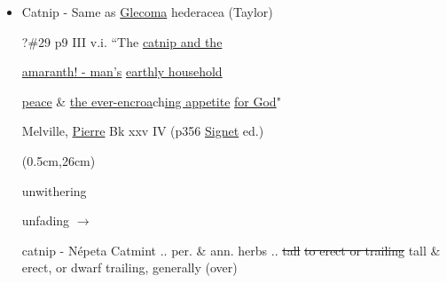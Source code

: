 \documentclass[a4paper,10pt]{article}
\begin{document}
\begin{flushleft}
\begin{itemize}
\item Catnip - Same as \underline{Glecoma} hederacea (Taylor)\par
{}
?\#29 p9 III v.i. ``The \ul{catnip and the} \par
\ul{amaranth! - man's} \ul{earthly household} \par
\ul{peace} \& \ul{the ever-encroa}ch\ul{ing appetite} \ul{for God}"\par
{}
Melville, \ul{Pierre} Bk xxv IV (p356 \ul{Signet} ed.)
\color{red}
\begin{textblock*}{2in}(0.5cm,26cm)%
    \small
    \begin{minipage}{2in} 
        \color{red}
        unwithering\par
        unfading $\rightarrow$
        \normalsize
  \end{minipage}%
  \end{textblock*}%

\color{red}
\begin{adjustwidth}{-0.5in}{-0.5in}
catnip - N\'epeta %
Catmint .. per. \& ann. herbs .. \sout{tall}
\sout{to erect or trailing} tall \& erect, or dwarf trailing, generally (over)
\end{adjustwidth}
\end{itemize}
\end{flushleft}
\end{document}
